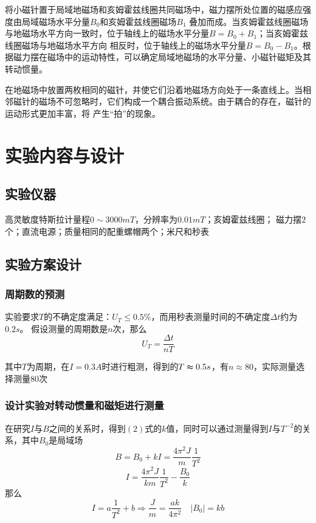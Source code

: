 \documentclass{article}
\begin{document}
将小磁针置于局域地磁场和亥姆霍兹线圈共同磁场中，磁力摆所处位置的磁感应强度由局域磁场水平分量$B_0$和亥姆霍兹线圈磁场$B_1$
叠加而成。当亥姆霍兹线圈磁场与地磁场水平方向一致时，位于轴线上的磁场水平分量$B=B_0+B_1$；当亥姆霍兹线圈磁场与地磁场水平方向
相反时，位于轴线上的磁场水平分量$B=B_0-B_1$。根据磁力摆在磁场中的运动特性，可以确定局域地磁场的水平分量、小磁针磁矩及其转动惯量。

在地磁场中放置两枚相同的磁针，并使它们沿着地磁场方向处于一条直线上。当相邻磁针的磁场不可忽略时，它们构成一个耦合振动系统。由于耦合的存在，磁针的运动形式更加丰富，将
产生“拍”的现象。
\section{实验内容与设计}
\subsection{实验仪器}
高灵敏度特斯拉计量程$0\sim 3000mT$，分辨率为$0.01mT$；亥姆霍兹线圈；
磁力摆$2$个；直流电源；质量相同的配重螺帽两个；米尺和秒表
\subsection{实验方案设计}
\subsubsection*{周期数的预测}
实验要求$T$的不确定度满足：$U_T\leq 0.5\%$，而用秒表测量时间的不确定度$\Delta t$约为$0.2s$。
假设测量的周期数是$n$次，那么$$U_T=\frac{\Delta t}{nT}$$

其中$T$为周期，在$I=0.3A$时进行粗测，得到的$T\thickapprox 0.5s$，有$n\approx 80$，实际测量选择测量80次
\subsubsection*{设计实验对转动惯量和磁矩进行测量}
在研究$I$与$B$之间的关系时，得到$(2)$式的$k$值，同时可以通过测量得到$I$与$T^{-2}$的关系，其中$B_0$是局域场
\begin{equation}
    B=B_0+kI=\frac{4 \pi^2J}{m}\frac{1}{T^2}
\end{equation}
\begin{equation}
    I=\frac{4 \pi^2J}{km}\frac{1}{T^2}-\frac{B_0}{k}
\end{equation}
那么
\begin{equation}
    I=a\frac{1}{T^2}+b \Longrightarrow \frac{J}{m}=\frac{ak}{4\pi ^2} \quad |B_0|=kb
\end{equation}
\end{document}
